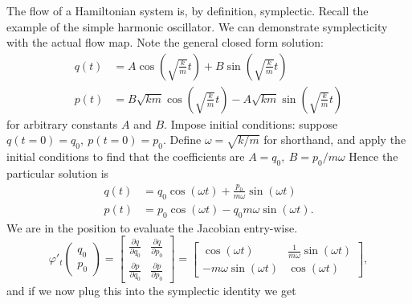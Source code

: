 \documentclass{report}
\theoremstyle{exampstyle} \newtheorem{example}[theorem]{Example}
\theoremstyle{exampstyle} \newtheorem{remark}[theorem]{Remark}
\theoremstyle{exampstyle} \newtheorem{definition}[theorem]{Definition}
\theoremstyle{exampstyle} \newtheorem{lemma}[theorem]{Lemma}
\theoremstyle{exampstyle} \newtheorem{proposition}[theorem]{Proposition}
\begin{document}
The flow of a Hamiltonian system is, by definition, symplectic.
Recall the example of the simple harmonic oscillator.
We can demonstrate symplecticity with the actual flow map. Note the general closed form solution:
\begin{equation*}
	\begin{aligned}
		q(t) &= A\cos\left( \sqrt{\frac{k}{m}} t \right) + B \sin\left( \sqrt{\frac{k}{m}}t \right) \\
		p(t) &= B\sqrt{km} \cos\left( \sqrt{\frac{k}{m}} t \right) -A\sqrt{km} \sin\left( \sqrt{\frac{k}{m}}t \right) 
	\end{aligned}
\end{equation*}
for arbitrary constants $A$ and $B$.
Impose initial conditions:
suppose $q(t=0) = q_0,~ p(t=0) = p_0.$
Define $\omega = \sqrt{k/m}$ for shorthand, and apply the initial conditions to find that the coefficients are $A = q_0,~ B = p_0/m \omega$
Hence the particular solution is
\begin{equation*}
	\begin{aligned}
		q(t) &= q_0 \cos\left( \omega t \right) + \frac{p_0}{m\omega} \sin\left( \omega t \right) \\
		p(t) &= p_0 \cos\left( \omega t \right) - q_0 m\omega \sin\left( \omega t \right).
	\end{aligned}
\end{equation*}
We are in the position to evaluate the Jacobian entry-wise.
\begin{equation*}
	\varphi'_t \begin{pmatrix}
		q_0 \\
		p_0
	\end{pmatrix} = \begin{bmatrix}
		\frac{\partial q}{\partial q_0} & \frac{\partial q}{\partial p_0} \\
		\frac{\partial p}{\partial q_0} & \frac{\partial p}{\partial p_0}
	\end{bmatrix} = \begin{bmatrix}
		\cos(\omega t) & \frac{1}{m\omega} \sin(\omega t) \\
		-m\omega \sin(\omega t) & \cos(\omega t)
	\end{bmatrix},
\end{equation*}
and if we now plug this into the symplectic identity we get
\end{document}
